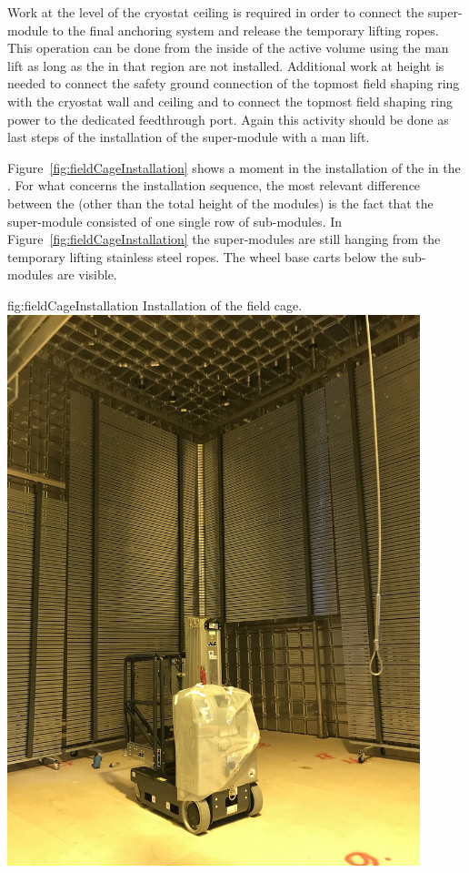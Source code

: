 Work at the level of the cryostat ceiling is required in order to connect the super-module to the final anchoring system and release the temporary lifting ropes.
This operation can be done from the inside of the active volume using the man lift as long as the  in that region are not installed.
Additional work at height is needed to connect the safety ground connection of the topmost field shaping ring with the cryostat wall and ceiling and to connect the topmost field shaping ring power to the dedicated feedthrough port.
Again this activity should be done as last steps of the installation of the super-module with a man lift.

Figure~\ref{fig:fieldCageInstallation} shows a moment in the installation of the  in the .
For what concerns the installation sequence, the most relevant difference between the  (other than the total height of the modules) is the fact that the super-module consisted of one single row of sub-modules.
In Figure~\ref{fig:fieldCageInstallation} the super-modules are still hanging from the temporary lifting stainless steel ropes.
The wheel base carts below the sub-modules are visible.
\begin{dunefigure}{fig:fieldCageInstallation}
{Installation of the  field cage.}
\includegraphics[width=0.9\textwidth]{graphics/fieldCageInstallation.jpg}
\end{dunefigure}


